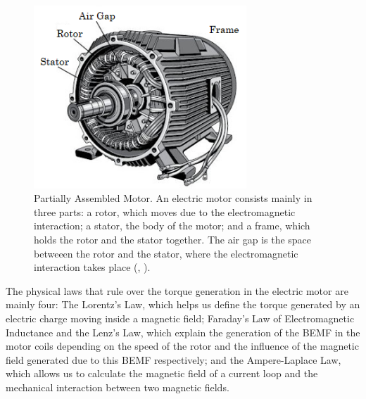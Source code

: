 \begin{figure}[htbp]
\centering
\includegraphics[width=8cm]{Images/motor_assembly.png} 
\caption[Partially Assembled Motor]{Partially Assembled Motor. An electric motor consists mainly in three parts: a rotor, which moves due to the electromagnetic interaction; a stator, the body of the motor; and a frame, which holds the rotor and the stator together. The air gap is the space betweeen the rotor and the stator, where the electromagnetic interaction takes place (, \citeyear{basic_components}).}
\label{fig:motor_assembly}
\end{figure}

The physical laws that rule over the torque generation in the electric motor are mainly four: The Lorentz’s Law, which helps us define the torque generated by an electric charge moving inside a magnetic field; Faraday’s Law of Electromagnetic Inductance and the Lenz’s Law, which explain the generation of the \acf{BEMF} in the motor coils depending on the speed of the rotor and the influence of the magnetic field generated due to this BEMF respectively; and the Ampere-Laplace Law, which allows us to calculate the magnetic field of a current loop and the mechanical interaction between two magnetic fields.

